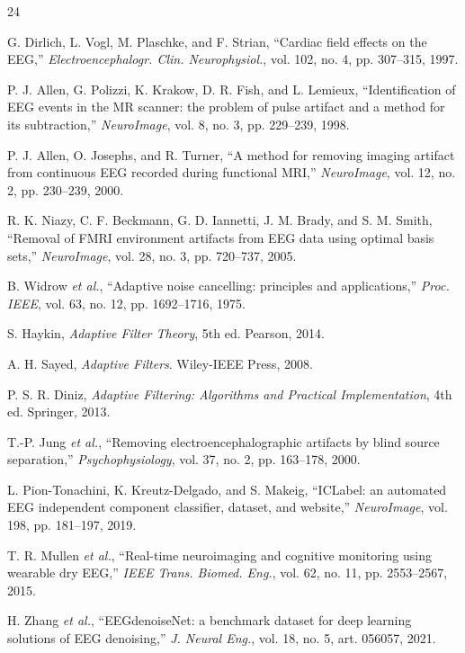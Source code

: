 \documentclass[conference]{IEEEtran}
\begin{document}
\begin{thebibliography}{24}

 G. Dirlich, L. Vogl, M. Plaschke, and F. Strian, ``Cardiac field effects on
the EEG,'' \emph{Electroencephalogr. Clin. Neurophysiol.}, vol. 102, no. 4, pp. 307--315, 1997.

 P. J. Allen, G. Polizzi, K. Krakow, D. R. Fish, and L. Lemieux,
``Identification of EEG events in the MR scanner: the problem of pulse artifact and a method for
its subtraction,'' \emph{NeuroImage}, vol. 8, no. 3, pp. 229--239, 1998.

 P. J. Allen, O. Josephs, and R. Turner, ``A method for removing imaging
artifact from continuous EEG recorded during functional MRI,'' \emph{NeuroImage}, vol. 12, no. 2,
pp. 230--239, 2000.

 R. K. Niazy, C. F. Beckmann, G. D. Iannetti, J. M. Brady, and S. M. Smith,
``Removal of FMRI environment artifacts from EEG data using optimal basis sets,''
\emph{NeuroImage}, vol. 28, no. 3, pp. 720--737, 2005.

 B. Widrow \emph{et al.}, ``Adaptive noise cancelling: principles and
applications,'' \emph{Proc. IEEE}, vol. 63, no. 12, pp. 1692--1716, 1975.

 S. Haykin, \emph{Adaptive Filter Theory}, 5th ed. Pearson, 2014.

 A. H. Sayed, \emph{Adaptive Filters}. Wiley-IEEE Press, 2008.

 P. S. R. Diniz, \emph{Adaptive Filtering: Algorithms and Practical
Implementation}, 4th ed. Springer, 2013.

 T.-P. Jung \emph{et al.}, ``Removing electroencephalographic artifacts by blind
source separation,'' \emph{Psychophysiology}, vol. 37, no. 2, pp. 163--178, 2000.

 L. Pion-Tonachini, K. Kreutz-Delgado, and S. Makeig, ``ICLabel: an automated EEG
independent component classifier, dataset, and website,'' \emph{NeuroImage}, vol. 198, pp.
181--197, 2019.

 T. R. Mullen \emph{et al.}, ``Real-time neuroimaging and cognitive monitoring
using wearable dry EEG,'' \emph{IEEE Trans. Biomed. Eng.}, vol. 62, no. 11, pp. 2553--2567, 2015.

 H. Zhang \emph{et al.}, ``EEGdenoiseNet: a benchmark dataset for deep learning
solutions of EEG denoising,'' \emph{J. Neural Eng.}, vol. 18, no. 5, art. 056057, 2021.


\end{thebibliography}
\end{document}
